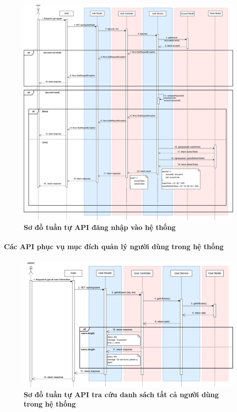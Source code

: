 \begin{figure}[H]
	\centering
	\includegraphics[width=16cm]{Images/api_sequence/authen/authentication-login.drawio.png}
	\caption[Sơ đồ tuần tự API đăng nhập vào hệ thống]{\bfseries \fontsize{12pt}{0pt}\selectfont Sơ đồ tuần tự API đăng nhập vào hệ thống}
	\label{sequence_diagram_login}
\end{figure}


\paragraph{Các API phục vụ mục đích quản lý người dùng trong hệ thống}
\mbox{}
\begin{figure}[H]
	\centering
	\includegraphics[width=16cm]{Images/api_sequence/user/getAllUsers.drawio.png}
	\caption[Sơ đồ tuần tự API tra cứu danh sách tất cả người dùng trong hệ thống]{\bfseries \fontsize{12pt}{0pt}\selectfont Sơ đồ tuần tự API tra cứu danh sách tất cả người dùng trong hệ thống}
	\label{sequence_diagram_get_all_users}
\end{figure}

